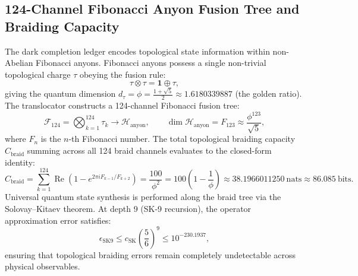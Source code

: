 \documentclass[11pt,onecolumn]{article}
\begin{document}
\FloatBarrier
\subsection{124-Channel Fibonacci Anyon Fusion Tree and Braiding Capacity}
The dark completion ledger encodes topological state information within non-Abelian Fibonacci anyons. Fibonacci anyons possess a single non-trivial topological charge $\tau$ obeying the fusion rule:
\begin{equation}
\tau \otimes \tau = \mathbf{1} \oplus \tau,
\end{equation}
giving the quantum dimension $d_\tau = \phi = \frac{1+\sqrt{5}}{2} \approx 1.6180339887$ (the golden ratio). The translocator constructs a 124-channel Fibonacci fusion tree:
\begin{equation}
\mathcal{F}_{124} = \bigotimes_{k=1}^{124} \tau_k \longrightarrow \mathcal{H}_{\text{anyon}}, \qquad \dim\mathcal{H}_{\text{anyon}} = F_{123} \approx \frac{\phi^{123}}{\sqrt{5}},
\end{equation}
where $F_n$ is the $n$-th Fibonacci number. The total topological braiding capacity $C_{\text{braid}}$ summing across all 124 braid channels evaluates to the closed-form identity:
\begin{equation}
C_{\text{braid}} = \sum_{k=1}^{124} \operatorname{Re}\left(1 - e^{2\pi i F_{k-1}/F_{k+2}}\right) = \frac{100}{\phi^2} = 100\left(1 - \frac{1}{\phi}\right) \approx 38.1966011250~\text{nats} \approx 86.085~\text{bits}.
\label{eq:c_braid_val}
\end{equation}
Universal quantum state synthesis is performed along the braid tree via the Solovay--Kitaev theorem. At depth 9 (SK-9 recursion), the operator approximation error satisfies:
\begin{equation}
\epsilon_{\text{SK9}} \le c_{\text{SK}} \left(\frac{5}{6}\right)^{9} \le 10^{-230.1937},
\end{equation}
ensuring that topological braiding errors remain completely undetectable across physical observables.

\FloatBarrier
\end{document}
